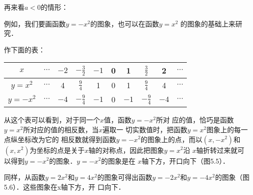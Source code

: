 再来看$a<0$的情形：

例如，我们要画函数$y=-x^2$的图象，也可以在函数$y=x^2$
的图象的基础上来研究．

作下面的表：
\begin{center}
\begin{tabular}{c|ccccccccc}
    \hline
$x$ &$\cdots$ & $-2$  & $-\tfrac{3}{2}$  & $-1$   & 0   & 1&$\tfrac{3}{2}$& 2&$\cdots$\\
\hline
$y=x^2$ &$\cdots$ & 4&$\tfrac{9}{4}$&1  & 0   & 1&$\tfrac{9}{4}$&4&$\cdots$\\
$y=-x^2$ &$\cdots$ & $-4$&$-\tfrac{9}{4}$&$-1$  & 0   & $-1$&$-\tfrac{9}{4}$&$-4$&$\cdots$\\
\hline
\end{tabular}    
\end{center}

从这个表可以看到，对于同一个$x$值，函数$y=-x^2$所对
应的值，恰巧是函数$y=x^2$所对应的值的相反数，当$x$遍取一
切实数值时，把函数$y=x^2$图象上的每一点纵坐标改为它的
相反数就得到函数$y=-x^2$的图象上的点，而以$(x,-x^2)$和
$(x,x^2)$为坐标的点是关于$x$轴的对称点，因此把图象$y=x^2$沿
$x$轴折转过来就可以得到$y=-x^2$的图象．$y=-x^2$的图象是在
$x$轴下方，开口向下（图5.5）．

同样，从函数$y=2x^2$和$y=4x^2$的图象可得出函数$y=
-2x^2$和$y=-4x^2$的图象（图5.6）．这些图象在x轴下方，开
口向下．

